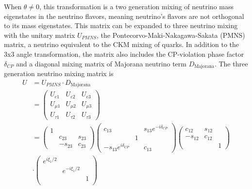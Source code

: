     When $\theta \neq 0$, this transformation is a two generation mixing of neutrino mass eigenstates in the neutrino flavors, meaning neutrino's flavors are not orthogonal to its mass eigenstates.
    This matrix can be expanded to three neutrino mixing with the unitary matrix $U_{PMNS}$, the Pontecorvo-Maki-Nakagawa-Sakata (PMNS) matrix, a neutrino equivalent to the CKM mixing of quarks. 
    In addition to the 3x3 angle transformation, the matrix also includes the CP-violation phase factor $\delta_{CP}$ and a diagonal mixing matrix of Majorana neutrino term $D_\textrm{Majorana}$. 
    The three generation neutrino mixing matrix is 
    \begin{equation}\label{eq16}
    \begin{aligned}
    U & =  U_{PMNS}\cdot D_\textrm{Majorana} \\
    & =  \left(\begin{array}{ccc}
    U_{e1} & U_{e2} & U_{e3} \\
    U_{\mu 1} & U_{\mu 2} & U_{\mu 3} \\
    U_{\tau 1} & U_{\tau 2} & U_{\tau 3}
    \end{array}\right) \\
    & = \left(\begin{array}{ccc}
    1   &   &  \\
        &   c_{23}  & s_{23} \\
        &   -s_{23} & c_{23}
    \end{array}\right) 
    \left(\begin{array}{ccc}
    c_{13}  &   & s_{13}e^{-i\delta_{CP}} \\
        & 1 &  \\
    -s_{13}e^{i\delta_{CP}}  &   & c_{13}
    \end{array}\right) 
    \left(\begin{array}{ccc}
    c_{12}  & s_{12}  &  \\
    -s_{12} & c_{12} &  \\
        &   & 1
    \end{array}\right)  \\
    &\cdot\left( \begin{array}{ccc}
    e^{i\xi_1/2} & & \\
    & e^{-i\xi_1/2} & \\
    & & 1 \\
    \end{array}\right)
    \end{aligned}
    \end{equation}

